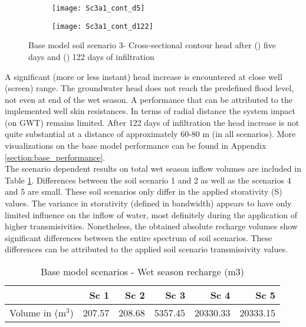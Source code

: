 \begin{figure}[h!]
	\centering
	\begin{subfigure}[b]{0.5\linewidth}
		\centering\texttt{[image: Sc3a1\_cont\_d5]}
		\captionsetup{justification=centering}		
		\caption{\label{fig:Sc3a1_cont_d5}}
		\end{subfigure}\hfill
	\begin{subfigure}[b]{0.5\linewidth}
        \centering\texttt{[image: Sc3a1\_cont\_d122]}
		\captionsetup{justification=centering}		
		\caption{\label{fig:Sc3a1_cont_d122}}
		\end{subfigure}
		\captionsetup{justification=centering}	
	\caption{Base model soil scenario 3- Cross-sectional contour head after () five days and () 122 days of infiltration} 
	\label{fig:Example_Sc3_base_cont_wet}
\end{figure} 

A significant (more or less instant) head increase is encountered at close well (screen) range. The groundwater head does not reach the predefined flood level, not even at end of the wet season. A performance that can be attributed to the implemented well skin resistances. In terms of radial distance the system impact (on GWT) remains limited. After 122 days of infiltration the head increase is not quite substantial at a distance of approximately 60-80 m (in all scenarios). More visualizations on the base model performance can be found in Appendix \ref{section:base_performance}. \\

The scenario dependent results on total wet season inflow volumes are included in Table \ref{tab:Base_recharge}. Differences between the soil scenario 1 and 2 as well as the scenarios 4 and 5 are small. These soil scenarios only differ in the applied storativity (S) values. The variance in storativity (defined in bandwidth) appears to have only limited influence on the inflow of water, most definitely during the application of higher transmisivities. Nonetheless, the obtained absolute recharge volumes show significant differences between the entire spectrum of soil scenarios. These differences can be attributed to the applied soil scenario transmissivity values. 

\begin{table}[h!]
\small
\centering
\caption{Base model scenarios - Wet season recharge (m3)}
\label{tab:Base_recharge}
\begin{tabular}{l|r|r|r|r|r}
\hline 
\textbf{}               & \textbf{Sc 1} & \textbf{Sc 2} & \textbf{Sc 3} & \textbf{Sc 4}  & \textbf{Sc 5} \\ \hline \hline
Volume in (m$^3$)       & 207.57        & 208.68        & 5357.45       & 20330.33       & 20333.15          \\ \hline    
\end{tabular}
\end{table}

